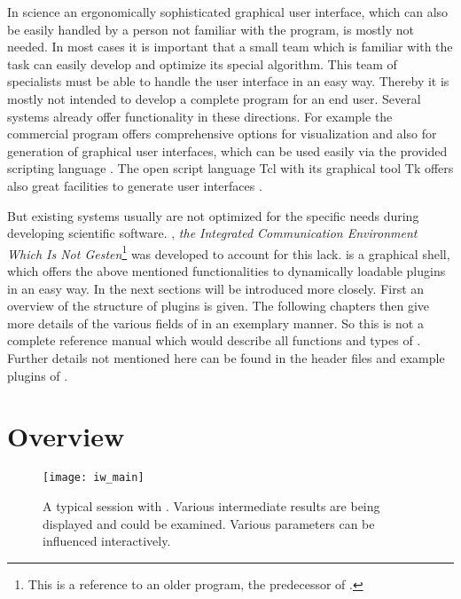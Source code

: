 In science an ergonomically sophisticated graphical user interface,
which can also be easily handled by a person not familiar with the
program, is mostly not needed. In most cases it is important that a
small team which is familiar with the task can easily develop and
optimize its special algorithm. This team of specialists must be
able to handle the user interface in an easy way. Thereby it is
mostly not intended to develop a complete program for an end
user. Several systems already offer functionality in these
directions. For example the commercial program
\matlab{} offers comprehensive options for
visualization and also for generation of graphical user interfaces,
which can be used easily via the provided scripting language
\cite{Matlab2003}. The open script language Tcl with its graphical
tool Tk offers also great facilities to generate user
interfaces \cite{Ousterhout1994-TAT}.

But existing systems usually are not optimized for the specific
needs during developing scientific software. \icewing{}, \emph{the
Integrated Communication Environment Which Is Not
Gesten}\footnote{This is a reference to an older program, the
predecessor of \icewing{}.} was developed to account for this
lack. \icewing{} is a graphical shell, which offers the above
mentioned functionalities to dynamically loadable
plugins in an easy way. In the next sections
\icewing{} will be introduced more closely. First an overview of the
structure of plugins is given. The following chapters then give more
details of the various fields of \icewing{} in an exemplary
manner. So this is not a complete reference manual which would
describe all functions and types of \icewing{}. Further details not
mentioned here can be found in the header files and example plugins
of \icewing{}.

\section{Overview}
\label{sec:p_overview}

\begin{figure}[htb]
  \begin{center}
    \texttt{[image: iw\_main]}
  \end{center}
  \caption[A typical session with \icewing{}]
  {A typical session with \icewing{}. Various intermediate
    results are being displayed and could be examined. Various
    parameters can be influenced interactively.}
  \label{fig:p_icewing}
\end{figure}

